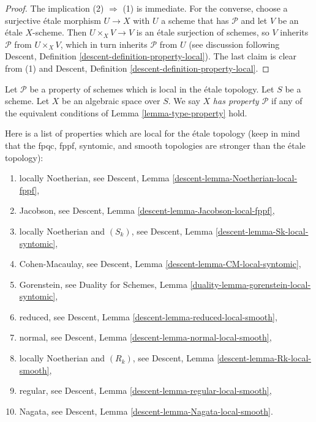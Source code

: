 \begin{proof}
The implication (2) $\Rightarrow$ (1) is immediate.
For the converse, choose a surjective \'etale morphism $U \to X$
with $U$ a scheme that has $\mathcal{P}$ and let $V$ be an \'etale
$X$-scheme. Then $U \times_X V \rightarrow V$ is an \'etale surjection
of schemes, so $V$ inherits $\mathcal{P}$ from $U \times_X V$, which in
turn inherits $\mathcal{P}$ from $U$ (see discussion following
Descent, Definition \ref{descent-definition-property-local}).
The last claim is clear from (1) and
Descent, Definition \ref{descent-definition-property-local}.
\end{proof}

\begin{definition}
\label{definition-type-property}
Let $\mathcal{P}$ be a property of schemes which is
local in the \'etale topology.
Let $S$ be a scheme.
Let $X$ be an algebraic space over $S$.
We say $X$ {\it has property $\mathcal{P}$}
if any of the equivalent conditions of
Lemma \ref{lemma-type-property}
hold.
\end{definition}

\begin{remark}
\label{remark-list-properties-local-etale-topology}
Here is a list of properties which are local for the \'etale topology
(keep in mind that the fpqc, fppf, syntomic, and smooth topologies are
stronger than the \'etale topology):
\begin{enumerate}
\item locally Noetherian, see
Descent, Lemma \ref{descent-lemma-Noetherian-local-fppf},
\item Jacobson, see
Descent, Lemma \ref{descent-lemma-Jacobson-local-fppf},
\item locally Noetherian and $(S_k)$, see
Descent, Lemma \ref{descent-lemma-Sk-local-syntomic},
\item Cohen-Macaulay, see
Descent, Lemma \ref{descent-lemma-CM-local-syntomic},
\item Gorenstein, see
Duality for Schemes, Lemma \ref{duality-lemma-gorenstein-local-syntomic},
\item reduced, see
Descent, Lemma \ref{descent-lemma-reduced-local-smooth},
\item normal, see
Descent, Lemma \ref{descent-lemma-normal-local-smooth},
\item locally Noetherian and $(R_k)$, see
Descent, Lemma \ref{descent-lemma-Rk-local-smooth},
\item regular, see
Descent, Lemma \ref{descent-lemma-regular-local-smooth},
\item Nagata, see
Descent, Lemma \ref{descent-lemma-Nagata-local-smooth}.
\end{enumerate}
\end{remark}

